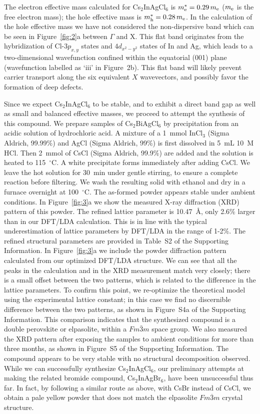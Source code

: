 \documentclass[journal=jpcl,manuscript=letter,layout=traditional]{achemso}
\begin{document}
The electron effective mass calculated for Cs$_2$InAgCl$_6$ is $m^*_{\rm e}=0.29\,m_{\rm e}$
($m_{\rm e}$ is the free electron mass); the hole effective mass is $m^*_{\rm h}=0.28\,m_{\rm e}$.
In the calculation of the hole effective mass we have not considered the non-dispersive
band which can be seen in Figure~\ref{fig:2}a between $\Gamma$ and X.
This flat band originates from the hybridization of Cl-$3p_{x,y}$ states and
$4d_{x^2-y^2}$ states of In and Ag, which leads to a two-dimensional wavefunction confined
within the equatorial (001) plane (wavefunction labelled as `iii' in Figure~2b).
This flat band will likely prevent carrier
transport along the six equivalent $X$ wavevectors, and possibly favor the formation
of deep defects.



Since we expect Cs$_2$InAgCl$_6$ to be stable, and to exhibit a direct band gap as well
as small and balanced effective masses, we proceed to attempt the synthesis of this compound.
We prepare samples of Cs$_2$BiAgCl$_6$ by precipitation from an acidic solution of hydrochloric
acid. A mixture of a 1~mmol InCl$_3$ (Sigma Aldrich, 99.99\%) and AgCl (Sigma Aldrich, 99\%) is
first dissolved in 5~mL 10~M HCl. Then 2~mmol of CsCl (Sigma Aldrich, 99.9\%) are added and
the solution is heated to 115~$^\circ$C. A white precipitate forms immediately after adding CsCl.
We leave the hot solution for 30~min under gentle stirring, to ensure a complete reaction
before filtering. We wash the resulting solid with ethanol and dry in a furnace overnight
at 100~$^\circ$C. The as-formed powder appears stable under ambient conditions. In Figure~\ref{fig:3}a
we show the measured X-ray diffraction (XRD) pattern of this powder. The refined lattice parameter
is 10.47~\AA, only 2.6\% larger than in our DFT/LDA calculation. This is in line with the typical
underestimation of lattice parameters by DFT/LDA in the range of 1-2\%.
The refined structural parameters are provided in Table~S2 of the Supporting Information.
In Figure~\ref{fig:3}a we include the powder diffraction pattern calculated from our optimized
DFT/LDA structure. We can see that all the peaks in the calculation and in the XRD measurement
match very closely; there is a small offset between the two patterns, which is related to the
difference in the lattice parameters. To confirm this point, we re-optimize the theoretical model using
the experimental lattice constant; in this case we find no discernible difference between the
two patterns, as shown in Figure~S4a of the Supporting Information. This comparison indicates that
the synthesized compound is a double perovskite or elpasolite, within a $Fm\bar{3}m$
space group. We also measured the XRD pattern after exposing the samples to ambient conditions for
more than three months, as shown in Figure~S5 of the Supporting Information. The compound
appears to be very stable with no structural decomposition observed. While we can
successfully synthesize Cs$_2$InAgCl$_6$, our preliminary attempts at making
the related bromide compound, Cs$_2$InAgBr$_6$, have been unsuccessful thus far. In fact, by
following a similar route as above, with CsBr instead of CsCl, we obtain a pale yellow powder that
does not match the elpasolite $Fm\overline{3}m$ crystal structure.
\end{document}
